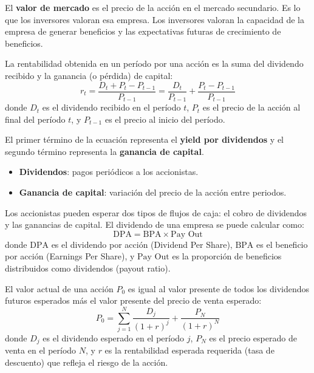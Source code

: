 \begin{definicion}
El \textbf{valor de mercado} es el precio de la acción en el mercado secundario. Es lo que los inversores valoran esa empresa. Los inversores valoran la capacidad de la empresa de generar beneficios y las expectativas futuras de crecimiento de beneficios.
\end{definicion}

\begin{definicion}
La rentabilidad obtenida en un período por una acción es la suma del dividendo recibido y la ganancia (o pérdida) de capital:
\begin{equation}
r_t = \frac{D_t + P_t - P_{t-1}}{P_{t-1}} = \frac{D_t}{P_{t-1}} + \frac{P_t - P_{t-1}}{P_{t-1}}
\end{equation}
donde $D_t$ es el dividendo recibido en el período $t$, $P_t$ es el precio de la acción al final del período $t$, y $P_{t-1}$ es el precio al inicio del período.
\end{definicion}

El primer término de la ecuación representa el \textbf{yield por dividendos} y el segundo término representa la \textbf{ganancia de capital}.

\begin{itemize}[leftmargin=*, topsep=2pt]
\item \textbf{Dividendos}: pagos periódicos a los accionistas.
\item \textbf{Ganancia de capital}: variación del precio de la acción entre periodos.
\end{itemize}

Los accionistas pueden esperar dos tipos de flujos de caja: el cobro de dividendos y las ganancias de capital. El dividendo de una empresa se puede calcular como:
\begin{equation}
\text{DPA} = \text{BPA} \times \text{Pay Out}
\end{equation}
donde $\text{DPA}$ es el dividendo por acción (Dividend Per Share), $\text{BPA}$ es el beneficio por acción (Earnings Per Share), y $\text{Pay Out}$ es la proporción de beneficios distribuidos como dividendos (payout ratio).

\begin{teorema}
El valor actual de una acción $P_0$ es igual al valor presente de todos los dividendos futuros esperados más el valor presente del precio de venta esperado:
\begin{equation}
P_0 = \sum_{j=1}^{N} \frac{D_j}{(1+r)^j} + \frac{P_N}{(1+r)^N}
\end{equation}
donde $D_j$ es el dividendo esperado en el período $j$, $P_N$ es el precio esperado de venta en el período $N$, y $r$ es la rentabilidad esperada requerida (tasa de descuento) que refleja el riesgo de la acción.
\end{teorema}

